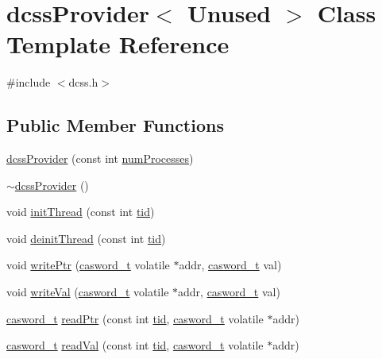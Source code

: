 \hypertarget{classdcssProvider}{}\section{dcss\+Provider$<$ Unused $>$ Class Template Reference}
\label{classdcssProvider}


{\ttfamily \#include $<$dcss.\+h$>$}

\subsection*{Public Member Functions}
\begin{DoxyCompactItemize}
\item 
\hyperlink{classdcssProvider_a3caba2c0668c1b75aa0d74272b8de625}{dcss\+Provider} (const int \hyperlink{testing_8cpp_aa085812188e21ede75351d88b9b2c30d}{num\+Processes})
\item 
\hyperlink{classdcssProvider_a5354fc777768de9e024c6597c54d9af3}{$\sim$dcss\+Provider} ()
\item 
void \hyperlink{classdcssProvider_a63c5a578a6805f375beb4e76e8a96ef3}{init\+Thread} (const int \hyperlink{microbench_2main_8cpp_a9ca9869868fe7e7a38a921cc7de4103f}{tid})
\item 
void \hyperlink{classdcssProvider_afe7a4173646ddfd368a8eb937dfee33b}{deinit\+Thread} (const int \hyperlink{microbench_2main_8cpp_a9ca9869868fe7e7a38a921cc7de4103f}{tid})
\item 
void \hyperlink{classdcssProvider_a0f37db9b12dccc452281eb40486c5050}{write\+Ptr} (\hyperlink{rq__unsafe_8h_ad45142aaf2ff20a036dc6242b8483e9c}{casword\+\_\+t} volatile $\ast$addr, \hyperlink{rq__unsafe_8h_ad45142aaf2ff20a036dc6242b8483e9c}{casword\+\_\+t} val)
\item 
void \hyperlink{classdcssProvider_ae9507935cbccf56456224e116053de48}{write\+Val} (\hyperlink{rq__unsafe_8h_ad45142aaf2ff20a036dc6242b8483e9c}{casword\+\_\+t} volatile $\ast$addr, \hyperlink{rq__unsafe_8h_ad45142aaf2ff20a036dc6242b8483e9c}{casword\+\_\+t} val)
\item 
\hyperlink{rq__unsafe_8h_ad45142aaf2ff20a036dc6242b8483e9c}{casword\+\_\+t} \hyperlink{classdcssProvider_a30a5b9836f756836dcf4a40b673f491e}{read\+Ptr} (const int \hyperlink{microbench_2main_8cpp_a9ca9869868fe7e7a38a921cc7de4103f}{tid}, \hyperlink{rq__unsafe_8h_ad45142aaf2ff20a036dc6242b8483e9c}{casword\+\_\+t} volatile $\ast$addr)
\item 
\hyperlink{rq__unsafe_8h_ad45142aaf2ff20a036dc6242b8483e9c}{casword\+\_\+t} \hyperlink{classdcssProvider_a147a9e2e8a48645cbc81517852437c7b}{read\+Val} (const int \hyperlink{microbench_2main_8cpp_a9ca9869868fe7e7a38a921cc7de4103f}{tid}, \hyperlink{rq__unsafe_8h_ad45142aaf2ff20a036dc6242b8483e9c}{casword\+\_\+t} volatile $\ast$addr)

\end{DoxyCompactItemize}
